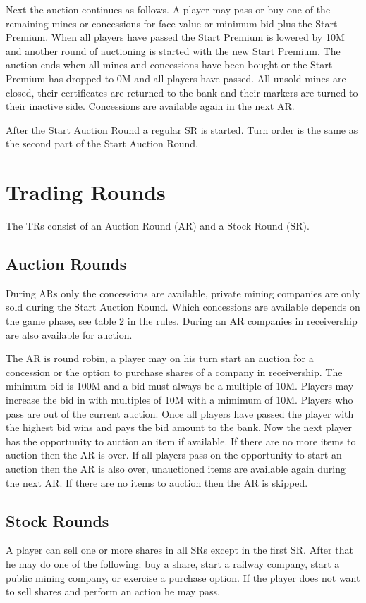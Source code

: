 \documentclass[a4paper,twocolumn]{article}
\begin{document}
Next the auction continues as follows. A player may pass or buy one of the
remaining mines or concessions for face value or minimum bid plus the Start
Premium. When all players have passed the Start Premium is lowered by 10M and
another round of auctioning is started with the new Start Premium. The auction
ends when all mines and concessions have been bought or the Start Premium has
dropped to 0M and all players have passed. All unsold mines are closed, their
certificates are returned to the bank and their markers are turned to their
inactive side. Concessions are available again in the next AR.

After the Start Auction Round a regular SR is started. Turn order is the same
as the second part of the Start Auction Round.

\section{Trading Rounds}
The TRs consist of an Auction Round (AR) and a Stock Round (SR).

\subsection{Auction Rounds}
During ARs only the concessions are available, private mining companies are only
sold during the Start Auction Round. Which concessions are available depends on
the game phase, see table 2 in the rules. During an AR companies in receivership
are also available for auction.

The AR is round robin, a player may on his turn start an auction for a
concession or the option to purchase shares of a company in receivership. The
minimum bid is 100M and a bid must always be a multiple of 10M. Players may
increase the bid in with multiples of 10M with a mimimum of 10M. Players who
pass are out of the current auction. Once all players have passed the player
with the highest bid wins and pays the bid amount to the bank. Now the next
player has the opportunity to auction an item if available. If there are no
more items to auction then the AR is over. If all players pass on the
opportunity to start an auction then the AR is also over, unauctioned items are
available again during the next AR. If there are no items to auction then the
AR is skipped.

\subsection{Stock Rounds}
A player can sell one or more shares in all SRs except in the first SR. After
that he may do one of the following: buy a share, start a railway company, start
a public mining company, or exercise a purchase option. If the player does not
want to sell shares and perform an action he may pass.
\end{document}
